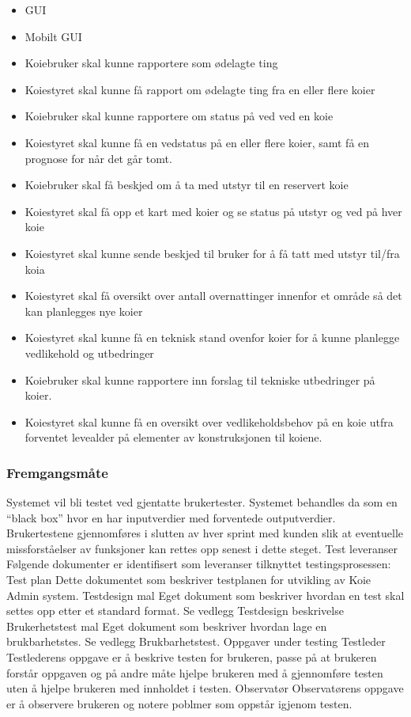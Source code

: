 \begin{itemize}
\item GUI
\item Mobilt GUI
\item Koiebruker skal kunne rapportere som ødelagte ting
\item Koiestyret skal kunne få rapport om ødelagte ting fra en eller flere koier
\item Koiebruker skal kunne rapportere om status på ved ved en koie
\item Koiestyret skal kunne få en vedstatus på en eller flere koier, samt få en prognose for når det går tomt.
\item Koiebruker skal få beskjed om å ta med utstyr til en reservert koie
\item Koiestyret skal få opp et kart med koier og se status på utstyr og ved på hver koie
\item Koiestyret skal kunne sende beskjed til bruker for å få tatt med utstyr til/fra koia
\item Koiestyret skal få oversikt over antall overnattinger innenfor et område så det kan planlegges nye koier
\item Koiestyret skal kunne få en teknisk stand ovenfor koier for å kunne planlegge vedlikehold og utbedringer
\item Koiebruker skal kunne rapportere inn forslag til tekniske utbedringer på koier.
\item Koiestyret skal kunne få en oversikt over vedlikeholdsbehov på en koie utfra forventet levealder på elementer av konstruksjonen til koiene.
\end{itemize}

\subsubsection{Fremgangsmåte}
Systemet vil bli testet ved gjentatte brukertester. Systemet behandles da som en “black box” hvor en har inputverdier med forventede outputverdier. Brukertestene gjennomføres i slutten av hver sprint med kunden slik at eventuelle missforståelser av funksjoner kan rettes opp senest i dette steget. 
Test leveranser
Følgende dokumenter er identifisert som leveranser tilknyttet testingsprosessen:
Test plan 
Dette dokumentet som beskriver testplanen for utvikling av Koie Admin system.
Testdesign mal 
Eget dokument som beskriver hvordan en test skal settes opp etter et standard format. Se vedlegg Testdesign beskrivelse
Brukerhetstest mal 
Eget dokument som beskriver hvordan lage en brukbarhetstes. Se vedlegg Brukbarhetstest.
Oppgaver under testing
Testleder
Testlederens oppgave er å beskrive testen for brukeren, passe på at brukeren forstår oppgaven og på andre måte hjelpe brukeren med å gjennomføre testen uten å hjelpe brukeren med innholdet i testen. 
Observatør
Observatørens oppgave er å observere brukeren og notere poblmer som oppstår igjenom testen. 




